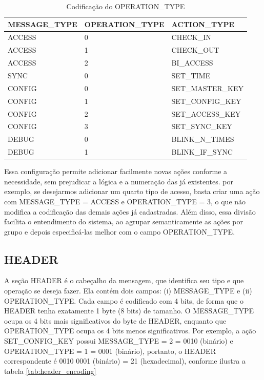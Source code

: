 \documentclass[12pt, letterpaper, twoside]{article}
\begin{document}
\begin{table}
\centering
\vspace{0.5em}
\begin{tabular}{lll}
MESSAGE\_TYPE & OPERATION\_TYPE & ACTION\_TYPE \\ \hline
ACCESS & 0 & CHECK\_IN\\
ACCESS & 1 & CHECK\_OUT\\
ACCESS & 2 & BI\_ACCESS\\
SYNC & 0 & SET\_TIME\\
CONFIG & 0 & SET\_MASTER\_KEY\\
CONFIG & 1 & SET\_CONFIG\_KEY\\
CONFIG & 2 & SET\_ACCESS\_KEY\\
CONFIG & 3 & SET\_SYNC\_KEY\\
DEBUG & 0 & BLINK\_N\_TIMES\\
DEBUG & 1 & BLINK\_IF\_SYNC\\
\hline
\end{tabular}
\label{tab:operation_types_encoding}
\caption{Codificação do OPERATION\_TYPE}
\end{table}

Essa configuração permite adicionar facilmente novas ações conforme a necessidade, sem prejudicar a lógica e a numeração das já existentes. por exemplo, se desejarmos adicionar um quarto tipo de acesso, basta criar uma ação com MESSAGE\_TYPE = ACCESS e OPERATION\_TYPE = 3, o que não modifica a codificação das demais ações já cadastradas. Além disso, essa divisão facilita o entendimento do sistema, ao agrupar semanticamente as ações por grupo e depois especificá-las melhor com o campo OPERATION\_TYPE.

\subsection{HEADER}
A seção HEADER é o cabeçalho da mensagem, que identifica seu tipo e que operação se deseja fazer. Ela contém dois campos: (i) MESSAGE\_TYPE e (ii) OPERATION\_TYPE. Cada campo é codificado com 4 bits, de forma que o HEADER tenha exatamente 1 byte (8 bits) de tamanho. O MESSAGE\_TYPE ocupa os 4 bits mais significativos do byte de HEADER, enquanto que OPERATION\_TYPE ocupa os 4 bits menos significativos. Por exemplo, a ação SET\_CONFIG\_KEY possui MESSAGE\_TYPE = 2 = 0010 (binário) e OPERATION\_TYPE = 1 = 0001 (binário), portanto, o HEADER correspondente é 0010 0001 (binário) = 21 (hexadecimal), conforme ilustra a tabela \ref{tab:header_encoding}
\end{document}
